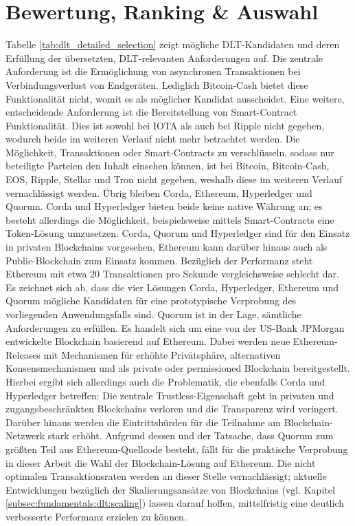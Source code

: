 %
%
\section{Bewertung, Ranking \& Auswahl}
\label{sec:dlt_selection:rating}
Tabelle \ref{tab:dlt_detailed_selection} zeigt mögliche \ac{DLT}-Kandidaten und deren Erfüllung der übersetzten, \ac{DLT}-relevanten Anforderungen auf. Die zentrale Anforderung ist die Ermöglichung von asynchronen Transaktionen bei Verbindungsverlust von Endgeräten. Lediglich Bitcoin-Cash bietet diese Funktionalität nicht, womit es als möglicher Kandidat ausscheidet. Eine weitere, entscheidende Anforderung ist die Bereitstellung von Smart-Contract Funktionalität. Dies ist sowohl bei IOTA als auch bei Ripple nicht gegeben, wodurch beide im weiteren Verlauf nicht mehr betrachtet werden. Die Möglichkeit, Transaktionen oder Smart-Contracts zu verschlüsseln, sodass nur beteiligte Parteien den Inhalt einsehen können, ist bei Bitcoin, Bitcoin-Cash, EOS, Ripple, Stellar und Tron nicht gegeben, weshalb diese im weiteren Verlauf vernachlässigt werden. Übrig bleiben Corda, Ethereum, Hyperledger und Quorum. Corda und Hyperledger bieten beide keine native Währung an; es besteht allerdings die Möglichkeit, beispielsweise mittels Smart-Contracts eine Token-Lösung umzusetzen. Corda, Quorum und Hyperledger sind für den Einsatz in privaten Blockchains vorgesehen, Ethereum kann darüber hinaus auch als Public-Blockchain zum Einsatz kommen. Bezüglich der Performanz steht Ethereum mit etwa 20 Transaktionen pro Sekunde vergleichsweise schlecht dar.\\
Es zeichnet sich ab, dass die vier Lösungen Corda, Hyperledger, Ethereum und Quorum mögliche Kandidaten für eine prototypische Verprobung des vorliegenden Anwendungsfalls sind. Quorum ist in der Lage, sämtliche Anforderungen zu erfüllen. Es handelt sich um eine von der US-Bank JPMorgan entwickelte Blockchain basierend auf Ethereum. Dabei werden neue Ethereum-Releases mit Mechanismen für erhöhte Privätsphäre, alternativen Konsensmechanismen und als private oder permissioned Blockchain bereitgestellt. Hierbei ergibt sich allerdings auch die Problematik, die ebenfalls Corda und Hyperledger betreffen: Die zentrale Trustless-Eigenschaft geht in privaten und zugangsbeschränkten Blockchains verloren und die Transparenz wird veringert. Darüber hinaus werden die Eintrittshürden für die Teilnahme am Blockchain-Netzwerk stark erhöht. Aufgrund dessen und der Tatsache, dass Quorum zum größten Teil aus Ethereum-Quellcode besteht, fällt für die praktische Verprobung in dieser Arbeit die Wahl der Blockchain-Lösung auf Ethereum. Die nicht optimalen Transaktionsraten werden an dieser Stelle vernachlässigt; aktuelle Entwicklungen bezüglich der Skalierungsansätze von Blockchains (vgl. Kapitel \ref{subsec:fundamentals:dlt:scaling}) lassen darauf hoffen, mittelfristig eine deutlich verbesserte Performanz erzielen zu können.
